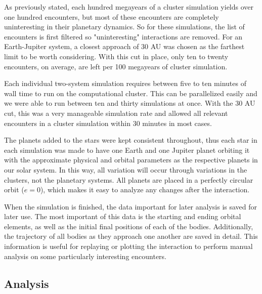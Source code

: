 \documentclass[12pt]{article}
\begin{document}
    As previously stated, each hundred megayears of a cluster simulation yields over
    one hundred encounters, but most of these encounters are completely uninteresting
    in their planetary dynamics. So for these simulations, the list of encounters is 
    first filtered so "uninteresting" interactions are removed. For an Earth-Jupiter
    system, a closest approach of 30 AU was chosen as the farthest limit to be
    worth considering. With this cut in place, only ten to twenty encounters, on
    average, are left per 100 megayears of cluster simulation.


    Each individual two-system simulation requires between five to ten 
    minutes of wall time to run on the computational cluster. This can be
    parallelized easily and we were able to run between ten and thirty 
    simulations at once. With the 30 AU cut, this was a very manageable 
    simulation rate and allowed all relevant encounters in a cluster simulation
    within 30 minutes in most cases.

    The planets added to the stars were kept consistent throughout, thus 
    each star in each simulation was made to have one Earth and one Jupiter planet
    orbiting it with the approximate physical and orbital
    parameters as the respective planets in our solar system. 
    In this way, all variation will occur through variations in the clusters, not
    the planetary systems.
    All planets are
    placed in a perfectly circular orbit ($e=0$), which makes it easy to analyze
    any changes after the interaction.

    When the simulation is finished, the data important for later analysis is
    saved for later use. The most important of this data is the starting and ending
    orbital elements, as well as the initial final positions of each of the bodies.
    Additionally, the trajectory of all bodies as they approach one another are
    saved in detail. This information is useful for replaying or plotting the
    interaction to perform manual analysis on some particularly interesting 
    encounters.


    \subsection{Analysis}
\end{document}
